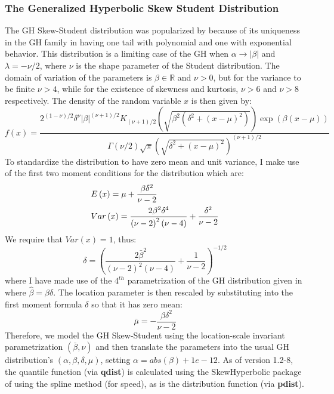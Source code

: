 \subsubsection{The Generalized Hyperbolic Skew Student Distribution}\label{ghskt}
The GH Skew-Student distribution was popularized by \cite{Aas2006} because of its uniqueness
in the GH family in having one tail with polynomial and one with exponential behavior.
This distribution is a limiting case of the GH when $\alpha  \to \left| \beta  \right|$
and $\lambda=-\nu/2$, where $\nu$ is the shape parameter of the Student distribution.
The domain of variation of the parameters is $\beta  \in \mathbb{R}$ and $\nu>0$, but
for the variance to be finite $\nu>4$, while for the existence of skewness and kurtosis,
$\nu>6$ and $\nu>8$ respectively. The density of the random variable $x$ is then given
by:
\begin{equation}
f\left( x \right) = \frac{{{2^{\left( {1 - \nu } \right)/2}}{\delta ^\nu }{{\left| \beta  \right|}^{\left( {\nu  + 1} \right)/2}}{K_{\left( {\nu  + 1} \right)/2}}\left( {\sqrt {{\beta ^2}\left( {{\delta ^2} + {{\left( {x - \mu } \right)}^2}} \right)} } \right)\exp \left( {\beta \left( {x - \mu } \right)} \right)}}
{{\Gamma \left( {\nu /2} \right)\sqrt \pi  {{\left( {\sqrt {{\delta ^2} + {{\left( {x - \mu } \right)}^2}} } \right)}^{\left( {\nu  + 1} \right)/2}}}}
\end{equation}
To standardize the distribution to have zero mean and unit variance, I make use
of the first two moment conditions for the distribution which are:
\begin{equation}
\begin{gathered}
  E\left( x \right) = \mu  + \frac{{\beta {\delta ^2}}}
{{\nu  - 2}} \hfill \\
  Var\left( x \right) = \frac{{2{\beta ^2}{\delta ^4}}}
{{{{\left( {\nu  - 2} \right)}^2}\left( {\nu  - 4} \right)}} + \frac{{{\delta ^2}}}
{{\nu  - 2}} \hfill \\
\end{gathered}
\end{equation}
We require that $Var(x)=1$, thus:
\begin{equation}
\delta  = {\left( {\frac{{2{{\bar \beta }^2}}}
{{{{\left( {\nu  - 2} \right)}^2}\left( {\nu  - 4} \right)}} + \frac{1}
{{\nu  - 2}}} \right)^{ - 1/2}}
\end{equation}
where I have made use of the $4^{th}$ parametrization of the GH distribution given in
\cite{Prause1999} where $\hat \beta = \beta \delta$. The location parameter is then rescaled
by substituting into the first moment formula $\delta$ so that it has zero mean:
\begin{equation}
\bar \mu  =  - \frac{{\beta {\delta ^2}}}{{\nu  - 2}}
\end{equation}
Therefore, we model the GH Skew-Student using the location-scale invariant parametrization $(\bar \beta, \nu)$
and then translate the parameters into the usual GH distribution's $(\alpha, \beta, \delta, \mu)$, setting
$\alpha = abs(\beta)+1e-12$.
As of version 1.2-8, the quantile function (via \textbf{qdist}) is calculated using
the SkewHyperbolic package of \cite{Scott} using the spline method (for speed), as
is the distribution function (via \textbf{pdist}).
